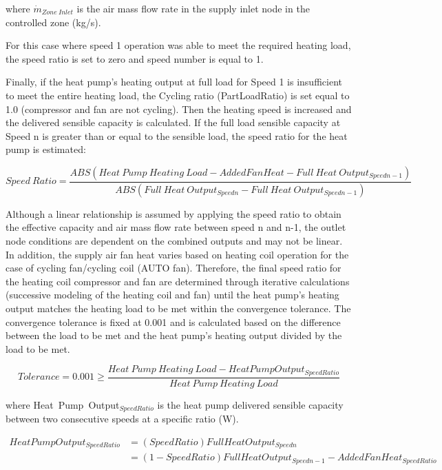 where \({{{\dot m}_{Zone~Inlet}}}\) is the air mass flow rate in the supply inlet node in the controlled zone (kg/s).

For this case where speed 1 operation was able to meet the required heating load, the speed ratio is set to zero and speed number is equal to 1.

Finally, if the heat pump's heating output at full load for Speed 1 is insufficient to meet the entire heating load, the Cycling ratio (PartLoadRatio) is set equal to 1.0 (compressor and fan are not cycling). Then the heating speed is increased and the delivered sensible capacity is calculated. If the full load sensible capacity at Speed n is greater than or equal to the sensible load, the speed ratio for the heat pump is estimated:

\begin{equation}
Speed~Ratio = \frac{{ABS(Heat~Pump~Heating~Load - AddedFanHeat - Full~Heat~Outpu{t_{Speedn-1}})}}{{ABS(Full~Heat~Outpu{t_{Speedn}} - Full~Heat~Outpu{t_{Speedn-1}})}}
\end{equation}

Although a linear relationship is assumed by applying the speed ratio to obtain the effective capacity and air mass flow rate between speed n and n-1, the outlet node conditions are dependent on the combined outputs and may not be linear. In addition, the supply air fan heat varies based on heating coil operation for the case of cycling fan/cycling coil (AUTO fan). Therefore, the final speed ratio for the heating coil compressor and fan are determined through iterative calculations (successive modeling of the heating coil and fan) until the heat pump's heating output matches the heating load to be met within the convergence tolerance. The convergence tolerance is fixed at 0.001 and is calculated based on the difference between the load to be met and the heat pump's heating output divided by the load to be met.

\begin{equation}
Tolerance = 0.001 \ge \frac{{Heat~Pump~Heating~Load - HeatPumpOutpu{t_{SpeedRatio}}}}{{Heat~Pump~Heating~Load}}
\end{equation}

where Heat~Pump~Output\(_{SpeedRatio}\) is the heat pump delivered sensible capacity between two consecutive speeds at a specific ratio (W).

\begin{equation}
\begin{array}{rl}
HeatPumpOutpu{t_{SpeedRatio}} &= (SpeedRatio)FullHeatOutpu{t_{Speedn}} \\
 &= (1 - SpeedRatio)FullHeatOutpu{t_{Speedn-1}} - AddedFanHea{t_{SpeedRatio}}
 \end{array}
\end{equation}

